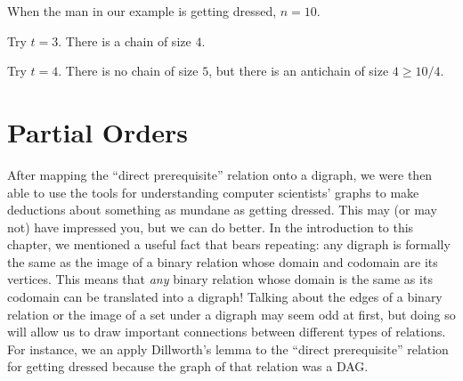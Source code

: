 \begin{example}
When the man in our example is getting dressed, $n = 10$.

Try $t = 3$.  There is a chain of size $4$.

Try $t = 4$.  There is no chain of size $5$, but there is an antichain of
size $4 \geq 10 / 4$.
\end{example}

\iffalse
\begin{example}
Suppose we have a class of 101 students.  Then using the product partial
order, $Y$, from Example~\ref{Y}, we can apply Dilworth's Lemma to
conclude that there is a chain of 11 students who get taller as they get
older, or an antichain of 11 students who get taller as they get younger,
which makes for an amusing in-class demo.
\end{example}
\fi

\begin{problems}
\practiceproblems
{}
{}

\classproblems
{}


\homeworkproblems
{}


\end{problems}

\section{Partial Orders}

After mapping the ``direct prerequisite'' relation onto a digraph, we
were then able to use the tools for understanding computer scientists'
graphs to make deductions about something as mundane as getting
dressed. This may (or may not) have impressed you, but we can do
better.  In the introduction to this chapter, we mentioned a useful
fact that bears repeating: any digraph is formally the same as the
image of a binary relation whose domain and codomain are its
vertices. This means that \emph{any} binary relation whose domain is
the same as its codomain can be translated into a digraph!  Talking
about the edges of a binary relation or the image of a set under a
digraph may seem odd at first, but doing so will allow us to draw
important connections between different types of relations.  For
instance, we an apply Dillworth's lemma to the ``direct prerequisite''
relation for getting dressed because the graph of that relation was a
DAG.

